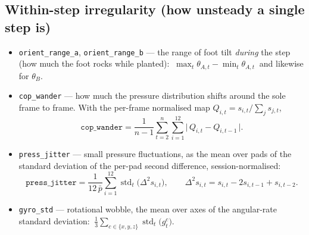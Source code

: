 \documentclass[11pt]{article}
\newcommand{\code}[1]{\texttt{#1}}
\begin{document}
\subsection{Within-step irregularity (how unsteady a single step is)}
\begin{itemize}
  \item \code{orient_range_a}, \code{orient_range_b} --- the range of foot tilt \emph{during} the
  step (how much the foot rocks while planted):
  $\ \max_t\theta_{A,t}-\min_t\theta_{A,t}\ $ and likewise for $\theta_B$.
  \item \code{cop_wander} --- how much the pressure distribution shifts around the sole frame to
  frame. With the per-frame normalised map $Q_{i,t}=s_{i,t}\big/\sum_{j}s_{j,t}$,
  \begin{equation}
  \code{cop\_wander}=\frac{1}{n-1}\sum_{t=2}^{n}\sum_{i=1}^{12}\bigl|\,Q_{i,t}-Q_{i,t-1}\,\bigr|.
  \end{equation}
  \item \code{press_jitter} --- small pressure fluctuations, as the mean over pads of the standard
  deviation of the per-pad second difference, session-normalised:
  \begin{equation}
  \code{press\_jitter}=\frac{1}{12\,\bar p}\sum_{i=1}^{12}\operatorname{std}_t\!\bigl(\Delta^2 s_{i,t}\bigr),
  \qquad \Delta^2 s_{i,t}=s_{i,t}-2s_{i,t-1}+s_{i,t-2}.
  \end{equation}
  \item \code{gyro_std} --- rotational wobble, the mean over axes of the angular-rate standard
  deviation: $\ \tfrac13\sum_{c\in\{x,y,z\}}\operatorname{std}_t\!\bigl(g^{c}_t\bigr)$.
\end{itemize}
\end{document}
